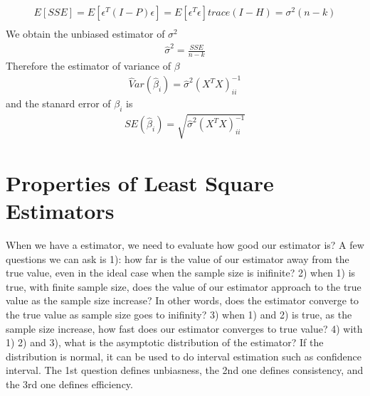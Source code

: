 \documentclass[a4paper]{article}
\begin{document}
\begin{align*}
E[SSE] = E[\epsilon^T(I-P)\epsilon] = E[\epsilon^T \epsilon] trace(I-H)
          = \sigma^2(n-k)\\
\end{align*}
We obtain the unbiased estimator of $\sigma^2$\\
\begin{align*}
\hat \sigma^2 = \frac{SSE}{n-k}
\end{align*}
Therefore the estimator of variance of $\beta$
\begin{align*}
\hat Var(\hat \beta_i) = \hat \sigma^2(X^TX)^{-1}_{ii}
\end{align*}
and the stanard error of $\beta_i$ is
\begin{align*}
SE(\hat \beta_i) = \sqrt{ \hat \sigma^2(X^TX)^{-1}_{ii}}
\end{align*}
\section{Properties of Least Square Estimators}
When we have a estimator, we need to evaluate how good our estimator is? A few questions we can ask is 1): how far is the value of our estimator away from the true value, even in the ideal case when the sample size is inifinite? 2) when 1) is true, with finite sample size, does the value of our estimator approach to the true value as the sample size increase? In other words, does the estimator converge to the true value as sample size goes to inifinity? 3) when 1) and 2) is true, as the sample size increase, how fast does our estimator converges to true value? 4) with 1) 2) and 3), what is the asymptotic distribution of the estimator? If the distribution is normal, it can be used to do interval estimation such as confidence interval. The 1st question defines unbiasness, the 2nd one defines consistency, and the 3rd one defines efficiency.\\ 
\end{document}
